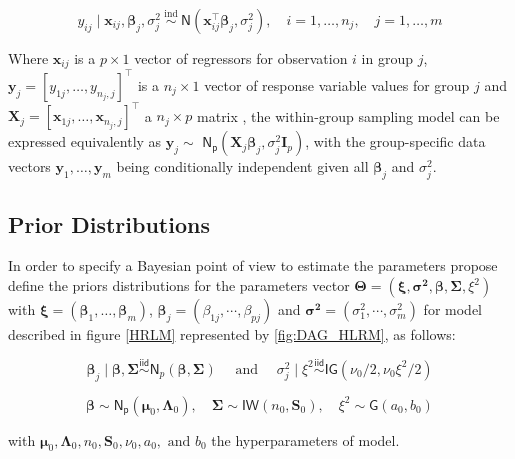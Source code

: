 \begin{equation}
\label{HRLM}
y_{ij} \mid \bm{x}_{ij}, \bm{\beta}_j, \sigma_j^2 \stackrel{\text { ind }}{\sim} \mathsf{N}\left(\bm{x}_{ij}^{\bm{\top}} \bm{\beta}_j, \sigma_j^2\right), \quad i=1, \ldots, n_j, \quad j=1, \ldots, m
\end{equation}

Where $\bm{x}_{ij}$ is a $p \times 1$ vector of regressors for observation $i$ in group $j$,  $\bm{y}_j = \left[y_{1j}, \ldots, y_{n_j, j}\right]^\top$  is a $n_j \times 1$ vector of response variable values for group $j$  and $\mathbf{X}_j = \left[\bm{x}_{1j}, \ldots, \bm{x}_{n_j, j}\right]^\top$ a $n_j \times p$ matrix , the within-group sampling model can be expressed equivalently as $\bm{y}_j \sim$  $\mathsf{N_p}\left(\mathbf{X}_j \bm{\beta}_j, \sigma^2_j \mathbf{I}_p\right)$, with the group-specific data vectors $\bm{y}_1, \ldots, \bm{y}_m$ being conditionally independent given all $\bm{\beta}_j$ and $\sigma^2_j$.

\subsection{Prior Distributions}

In order to specify a Bayesian point of view to estimate the parameters   \cite{SOSA} propose define the priors distributions for the parameters vector $\bm{\Theta}=(\bm{\xi},\bm{\sigma^2},\bm{\beta},\bm{\Sigma},\xi^2)$ with $\bm{\xi}=(\bm{\beta}_1, \ldots, \bm{\beta}_m)$,    $\bm{\beta}_j=(\beta_{1j},\cdots,\beta_{pj})$ and $\bm{\sigma^2}=(\sigma_1^2,\cdots,\sigma_m^2)$  for model described in figure \ref{HRLM} represented by \ref{fig:DAG_HLRM}, as follows:

\begin{equation}
    \label{hyper_HRLM_1}
    \bm{\beta}_j \mid \bm{\beta}, \bm{\Sigma} \stackrel{\mathsf{iid}}{\sim} \mathsf{N}_p(\bm{\beta}, \bm{\Sigma}) \quad \text { and } \quad \sigma_j^2 \mid \xi^2 \stackrel{\mathsf{iid}}{\sim} \mathsf{IG}\left(\nu_0 / 2, \nu_0 \xi^2 / 2\right)
\end{equation}

\begin{equation}
    \label{hyper_HRLM_2}
    \bm{\beta} \sim \mathsf{N_p}\left(\bm{\mu}_0, \bm{\Lambda}_0\right), \quad \bm{\Sigma} \sim \mathsf{IW}\left(n_0, \mathbf{S}_0\right), \quad \xi^2 \sim \mathsf{G}\left(a_0, b_0\right)
\end{equation}

with $\bm{\mu}_0, \bm{\Lambda}_0, n_0, \mathbf{S}_0, \nu_0, a_0, \text { and } b_0$ the hyperparameters of model.

